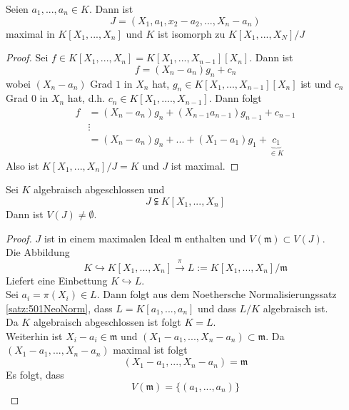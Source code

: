 	\begin{satz}
		Seien $a_1,...,a_n\in K$. Dann ist
		\[J=(X_1,a_1,x_2-a_2,...,X_n-a_n)\]
		maximal in $K[X_1,...,X_n]$ und $K$ ist isomorph zu $K[X_1,...,X_N]/J$
	\end{satz}
	\begin{proof}
		Sei $f\in  K[X_1,...,X_n]=K[X_1,...,X_{n-1}][X_n]$. Dann ist
		\[f=(X_n-a_n)g_n+c_n\]
		wobei $(X_n-a_n)$ Grad $1$ in $X_n$ hat, $g_n\in K[X_1,...,X_{n-1}][X_n]$ ist und $c_n$ Grad $0$ in $X_n$ hat, d.h. $c_n\in K[X_1,....,X_{n-1}]$. Dann folgt
		\begin{align*}
		f&=(X_n-a_n)g_n+(X_{n-1}a_{n-1})g_{n-1}+c_{n-1}\\
		&\vdots\\
		&=(X_n-a_n)g_n+...+(X_1-a_1)g_1+\underbrace{c_1}_{\in K}
		\end{align*}
		Also ist $K[X_1,...,X_n]/J=K$ und $J$ ist maximal.
	\end{proof}

	\begin{theorem}
		Sei $K$ algebraisch abgeschlossen und
		\[J\subsetneqq K[X_1,...,X_n]\]
		Dann ist $V(J)\neq\emptyset$.
	\end{theorem}
	\begin{proof}
		$J$ ist in einem maximalen Ideal $\mathfrak m$ enthalten und $V(\mathfrak m)\subset V(J)$.\\
		Die Abbildung
		\[K\hookrightarrow K[X_1,...,X_n]\xrightarrow{\pi}L:=K[X_1,...,X_n]/\mathfrak m\]
		Liefert eine Einbettung $K\hookrightarrow L$.\\
		Sei $a_i=\pi(X_i)\in L$. Dann folgt aus dem Noethersche Normalisierungssatz \ref{satz:501NeoNorm}, dass $L=K[a_1,...,a_n]$ und dass $L/K$ algebraisch ist.\\
		Da $K$ algebraisch abgeschlossen ist folgt $K=L$.\\
		Weiterhin ist $X_i-a_i\in\mathfrak m$ und $(X_1-a_1,...,X_n-a_n)\subset \mathfrak m$. Da $(X_1-a_1,...,X_n-a_n)$ maximal ist folgt
		\[(X_1-a_1,...,X_n-a_n)=\mathfrak m\]
		Es folgt, dass
		\[V(\mathfrak m)=\{(a_1,...,a_n)\}\]
	\end{proof}

